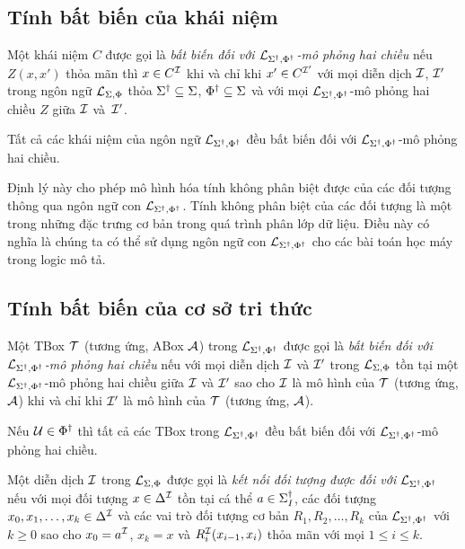 \subsection{Tính bất biến của khái niệm}
\label{sec:Chap2.ConceptInvariant}

\begin{Definition}
\label{def:InvariantConcept}
	Một khái niệm $C$ được gọi là {\em bất biến đối với $\mathcal{L}_{\Sigma^\dag,\Phi^\dag}$-mô phỏng hai chiều} nếu $Z(x, x')$ thỏa mãn thì $x \in C^{\mathcal{I}}$ khi và chỉ khi $x' \in C^{\mathcal{I}'}$ với mọi diễn dịch $\mathcal{I}$, $\mathcal{I}'$ trong ngôn ngữ $\mathcal{L}_{\Sigma,\Phi}$ thỏa $\Sigma^\dag \subseteq \Sigma$, $\Phi^\dag \subseteq \Sigma$ và với mọi $\mathcal{L}_{\Sigma^\dag,\Phi^\dag}$-mô phỏng hai chiều $Z$ giữa $\mathcal{I}$ và~$\mathcal{I}'$.\myend
\end{Definition}

\begin{Theorem}
	\label{th:ConceptInvariant}
	Tất cả các khái niệm của ngôn ngữ $\mathcal{L}_{\Sigma^\dag,\Phi^\dag}$ đều bất biến đối với $\mathcal{L}_{\Sigma^\dag,\Phi^\dag}$-mô phỏng hai chiều.\myend
\end{Theorem}

Định lý này cho phép mô hình hóa tính không phân biệt được của các đối tượng thông qua ngôn ngữ con $\mathcal{L}_{\Sigma^\dag,\Phi^\dag}$. Tính không phân biệt của các đối tượng là một trong những đặc trưng cơ bản trong quá trình phân lớp dữ liệu. Điều này có nghĩa là chúng ta có thể sử dụng ngôn ngữ con $\mathcal{L}_{\Sigma^\dag,\Phi^\dag}$ cho các bài toán học máy trong logic mô tả.

\subsection{Tính bất biến của cơ sở tri thức}
\label{sec:Chap2.KnowlwdgeBaseInvariant}

\begin{Definition}
\label{def:BoxInvariant}
	Một TBox $\mathcal{T}$ (tương ứng, ABox $\mathcal{A}$) trong $\mathcal{L}_{\Sigma^\dag,\Phi^\dag}$ được gọi là {\em bất biến đối với $\mathcal{L}_{\Sigma^\dag,\Phi^\dag}$-mô phỏng hai chiều} nếu với mọi diễn dịch $\mathcal{I}$ và $\mathcal{I}'$ trong $\mathcal{L}_{\Sigma,\Phi}$ tồn tại một $\mathcal{L}_{\Sigma^\dag,\Phi^\dag}$-mô phỏng hai chiều giữa $\mathcal{I}$ và $\mathcal{I}'$ sao cho $\mathcal{I}$ là mô hình của $\mathcal{T}$ (tương ứng, $\mathcal{A}$) khi và chỉ khi $\mathcal{I}'$ là mô hình của $\mathcal{T}$ (tương ứng, $\mathcal{A}$).\myend
\end{Definition}

\begin{Corollary}
	\label{co:TBoxInvariant}
	Nếu $\mathcal{U} \in \Phi^\dag$ thì tất cả các TBox trong $\mathcal{L}_{\Sigma^\dag,\Phi^\dag}$ đều bất biến đối với $\mathcal{L}_{\Sigma^\dag,\Phi^\dag}$-mô phỏng hai chiều.\myend
\end{Corollary}

Một diễn dịch $\mathcal{I}$ trong $\mathcal{L}_{\Sigma,\Phi}$ được gọi là {\em kết nối đối tượng được đối với $\mathcal{L}_{\Sigma^\dag,\Phi^\dag}$} nếu với mọi đối tượng $x \in \Delta^{\mathcal{I}}$ tồn tại cá thể $a \in \Sigma^\dag_I$, các đối tượng $x_0, x_1, \ldots, x_k \in \Delta^{\mathcal{I}}$ và các vai trò đối tượng cơ bản $R_1, R_2, \ldots, R_k$ của $\mathcal{L}_{\Sigma^\dag,\Phi^\dag}$ với $k \geq 0$ sao cho $x_0 = a^{\mathcal{I}}$, $x_k = x$ và $R_i^{\mathcal{I}}(x_{i-1}, x_i)$ thỏa mãn với mọi $1 \leq i \leq k$.

